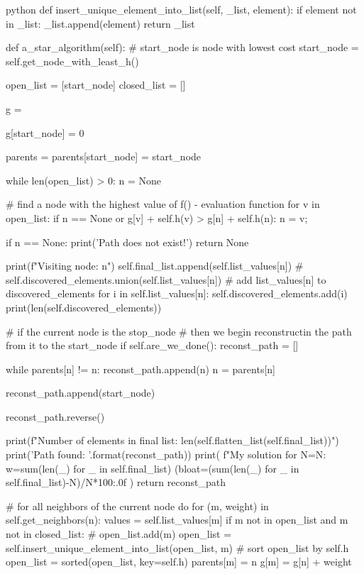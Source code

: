 \begin{mintedbox}{python}
    def insert_unique_element_into_list(self, _list, element):
        if element not in _list:
            _list.append(element)
        return _list

    def a_star_algorithm(self):
        # start_node is node with lowest cost
        start_node = self.get_node_with_least_h()

        open_list = [start_node]
        closed_list = []

        g = {}

        g[start_node] = 0

        parents = {}
        parents[start_node] = start_node

        while len(open_list) > 0:
            n = None

            # find a node with the highest value of f() - evaluation function
            for v in open_list:
                if n == None or g[v] + self.h(v) > g[n] + self.h(n):
                    n = v;

            if n == None:
                print('Path does not exist!')
                return None

            print(f"Visiting node: {n}")
            self.final_list.append(self.list_values[n])
            # self.discovered_elements.union(self.list_values[n])
            # add list_values[n] to discovered_elements
            for i in self.list_values[n]:
                self.discovered_elements.add(i)
            print(len(self.discovered_elements))

            # if the current node is the stop_node
            # then we begin reconstructin the path from it to the start_node
            if self.are_we_done():
                reconst_path = []

                while parents[n] != n:
                    reconst_path.append(n)
                    n = parents[n]

                reconst_path.append(start_node)

                reconst_path.reverse()

                print(f"Number of elements in final list: {len(self.flatten_list(self.final_list))}")
                print('Path found: {}'.format(reconst_path))
                print(
                    f"My solution for N={N}: w={sum(len(_) for _ in self.final_list)} (bloat={(sum(len(_) for _ in self.final_list)-N)/N*100:.0f}%
                )
                return reconst_path

            # for all neighbors of the current node do
            for (m, weight) in self.get_neighbors(n):
                values = self.list_values[m]
                if m not in open_list and m not in closed_list:
                    # open_list.add(m)
                    open_list = self.insert_unique_element_into_list(open_list, m)
                    # sort open_list by self.h
                    open_list = sorted(open_list, key=self.h)
                    parents[m] = n
                    g[m] = g[n] + weight


\end{mintedbox}
